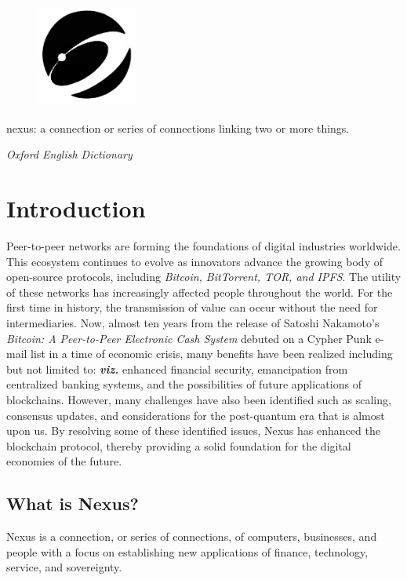 \documentclass[11pt]{article}
\begin{document}
\begin{figure}
    \centering
    \vspace{-25pt}
    \hspace{-15pt}
    \includegraphics[width=0.30\textwidth]{./images/IMG_1228.JPG}
\end{figure}

\epigraph{nexus: a connection or series of connections linking two or more things.}{\textit{\footnotesize{Oxford English Dictionary}}}

\section{Introduction}

Peer-to-peer networks are forming the foundations of digital industries worldwide.
This ecosystem continues to evolve as innovators advance the growing body of open-source protocols, including \textit{Bitcoin, BitTorrent, TOR, and IPFS}.
The utility of these networks has increasingly affected people throughout the world.
For the first time in history, the transmission of value can occur without the need for intermediaries.
Now, almost ten years from the release of Satoshi Nakamoto's \textit{Bitcoin: A Peer-to-Peer Electronic Cash System} \cite{bitcoin} debuted on a Cypher Punk e-mail list in a time of economic crisis, many benefits have been realized including but not limited to: \textbf{\textit{viz.}} enhanced financial security, emancipation from centralized banking systems, and the possibilities of future applications of blockchains. However, many challenges have also been identified such as scaling, consensus updates, and considerations for the post-quantum era that is almost upon us.
By resolving some of these identified issues, Nexus has enhanced the blockchain protocol, thereby providing a solid foundation for the digital economies of the future. 
\bigskip

\subsection{What is Nexus?}
Nexus is a connection, or series of connections, of computers, businesses, and people with a focus on establishing new applications of finance, technology, service, and sovereignty.  
\end{document}
